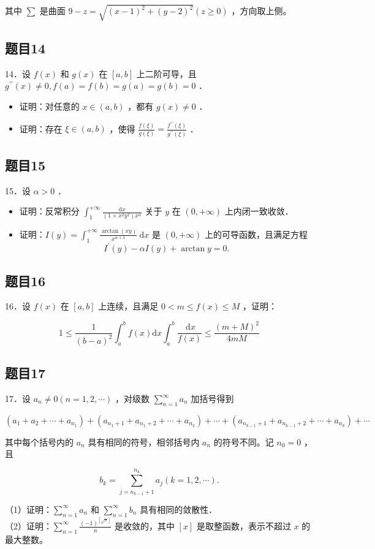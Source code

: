\documentclass{article}
\begin{document}
其中 \(\sum\) 是曲面 \(9-z=\sqrt{(x-1)^{2}+(y-2)^{2}}(z \geq 0)\) ，方向取上侧。

\subsection{题目14}
14．设 \(f(x)\) 和 \(g(x)\) 在 \([a, b]\) 上二阶可导，且 \(g^{\prime \prime}(x) \neq 0, f(a)=f(b)=g(a)=g(b)=0\) ．

\begin{itemize}
  \item[（1）] 证明：对任意的 \(x \in(a, b)\) ，都有 \(g(x) \neq 0\) ．
  \item[（2）] 证明：存在 \(\xi \in(a, b)\) ，使得 \(\frac{f(\xi)}{g(\xi)}=\frac{f^{\prime \prime}(\xi)}{g^{\prime \prime}(\xi)}\) ．
\end{itemize}

\subsection{题目15}
15．设 \(\alpha>0\) ．

\begin{itemize}
  \item[（1）] 证明：反常积分 \(\int_{1}^{+\infty} \frac{\mathrm{d} x}{\left(1+x^{2} y^{2}\right) x^{\alpha}}\) 关于 \(y\) 在 \((0,+\infty)\) 上内闭一致收敛．
  \item[（2）] 证明：\(I(y)=\int_{1}^{+\infty} \frac{\arctan (x y)}{x^{\alpha+1}} \mathrm{~d} x\) 是 \((0,+\infty)\) 上的可导函数，且满足方程
\[
I^{\prime}(y)-\alpha I(y)+\arctan y=0 .
\]
\end{itemize}

\subsection{题目16}
16．设 \(f(x)\) 在 \([a, b]\) 上连续，且满足 \(0<m \leq f(x) \leq M\) ，证明：

\[
1 \leq \frac{1}{(b-a)^{2}} \int_{a}^{b} f(x) \mathrm{d} x \int_{a}^{b} \frac{\mathrm{~d} x}{f(x)} \leq \frac{(m+M)^{2}}{4 m M}
\]

\subsection{题目17}
17．设 \(a_{n} \neq 0(n=1,2, \cdots)\) ，对级数 \(\sum_{n=1}^{\infty} a_{n}\) 加括号得到

\[
\left(a_{1}+a_{2}+\cdots+a_{n_{1}}\right)+\left(a_{n_{1}+1}+a_{n_{1}+2}+\cdots+a_{n_{2}}\right)+\cdots+\left(a_{n_{k-1}+1}+a_{n_{k-1}+2}+\cdots+a_{n_{k}}\right)+\cdots
\]

其中每个括号内的 \(a_{n}\) 具有相同的符号，相邻括号内 \(a_{n}\) 的符号不同。记 \(n_{0}=0\) ，且

\[
b_{k}=\sum_{j=n_{k-1}+1}^{n_{k}} a_{j}(k=1,2, \cdots) .
\]

（1）证明：\(\sum_{n=1}^{\infty} a_{n}\) 和 \(\sum_{n=1}^{\infty} b_{n}\) 具有相同的敛散性．\\
（2）证明：\(\sum_{n=1}^{\infty} \frac{(-1)^{[\sqrt{n}]}}{n}\) 是收敛的，其中 \([x]\) 是取整函数，表示不超过 \(x\) 的最大整数。
\end{document}
